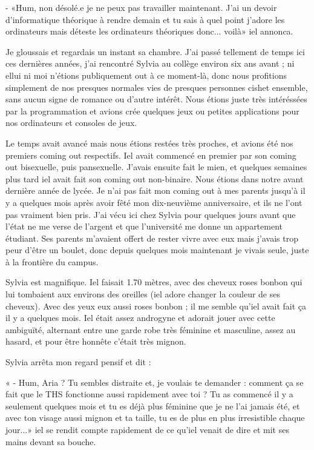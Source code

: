 \documentclass[12pt,hidelinks,a4paper]{book}
\renewcommand{\cdot}{\textbullet}
\begin{document}
\bigskip

- «Hum, non désolé.e je ne peux pas travailler maintenant. J'ai
un devoir d'informatique théorique à rendre demain et tu sais à quel
point j'adore les ordinateurs mais déteste les ordinateurs théoriques
donc... voilà» iel annonca. 

\bigskip

Je gloussais et regardais un instant sa chambre. J'ai passé tellement
de temps ici ces dernières années, j'ai rencontré Sylvia au collège
environ six ans avant ; ni ellui ni moi n'étions publiquement out
à ce moment-là, donc nous profitions simplement de nos presques normales
vies de presques personnes cishet ensemble, sans aucun signe de romance
ou d'autre intérêt. Nous étions juste très intéréssé\cdot es par la programmation
et avions crée quelques jeux ou petites applications pour nos ordinateurs
et consoles de jeux.

\bigskip

Le temps avait avancé mais nous étions resté\cdot es très proches, et avions
été nos premiers coming out respectifs. Iel avait commencé en premier
par son coming out bisexuel\cdot le, puis pansexuel\cdot le. J'avais ensuite
fait le mien, et quelques semaines plus tard iel avait fait son coming
out non-binaire. Nous étions dans notre avant dernière année de lycée.
Je n'ai pas fait mon coming out à mes parents jusqu'à il y a quelques
mois après avoir fêté mon dix-neuvième anniversaire, et ils ne l'ont
pas vraiment bien pris. J'ai vécu ici chez Sylvia pour quelques jours
avant que l'état ne me verse de l'argent et que l'université me donne
un appartement étudiant. Ses parents m'avaient offert de rester vivre
avec eux mais j'avais trop peur d'être un boulet, donc depuis quelques
mois maintenant je vivais seule, juste à la frontière du campus.

\bigskip

Sylvia est magnifique. Iel faisait 1.70 mètres, avec des cheveux roses
bonbon qui lui tombaient aux environs des oreilles (iel adore changer
la couleur de ses cheveux). Avec des yeux eux aussi roses bonbon ;
il me semble qu'iel avait fait ça il y a quelques mois. Iel était
assez androgyne et adorait jouer avec cette ambiguïté, alternant entre
une garde robe très féminine et masculine, assez au hasard, et pour
être honnête c'était très mignon.

\bigskip

Sylvia arrêta mon regard pensif et dit :

« - Hum, Aria ? Tu sembles distraite et, je voulais te demander :
comment ça se fait que le THS fonctionne aussi rapidement avec toi
? Tu as commencé il y a seulement quelques mois et tu es déjà plus
féminine que je ne l'ai jamais été, et avec ton visage aussi mignon
et ta taille, tu es de plus en plus irresistible chaque jour...»
iel se rendit compte rapidement de ce qu'iel venait de dire et mit
ses mains devant sa bouche.
\end{document}
